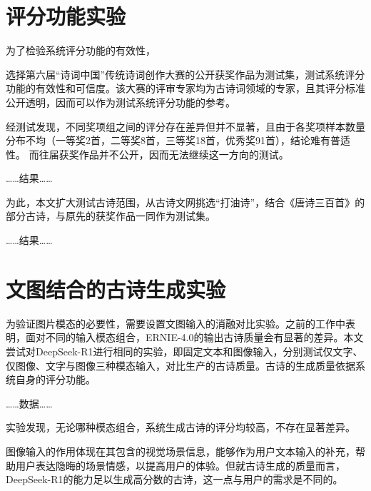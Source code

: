 \section{评分功能实验}

为了检验系统评分功能的有效性，

选择第六届“诗词中国”传统诗词创作大赛的公开获奖作品为测试集，测试系统评分功能的有效性和可信度。该大赛的评审专家均为古诗词领域的专家，且其评分标准公开透明，因而可以作为测试系统评分功能的参考。

经测试发现，不同奖项组之间的评分存在差异但并不显著，且由于各奖项样本数量分布不均（一等奖2首，二等奖8首，三等奖18首，优秀奖91首），结论难有普适性。 而往届获奖作品并不公开，因而无法继续这一方向的测试。

……结果……


为此，本文扩大测试古诗范围，从古诗文网挑选“打油诗”，结合《唐诗三百首》的部分古诗，与原先的获奖作品一同作为测试集。

……结果……

\section{文图结合的古诗生成实验}

为验证图片模态的必要性，需要设置文图输入的消融对比实验。之前的工作中表明，面对不同的输入模态组合，ERNIE-4.0的输出古诗质量会有显著的差异。本文尝试对DeepSeek-R1进行相同的实验，即固定文本和图像输入，分别测试仅文字、仅图像、文字与图像三种模态输入，对比生产的古诗质量。古诗的生成质量依据系统自身的评分功能。

……数据……

实验发现，无论哪种模态组合，系统生成古诗的评分均较高，不存在显著差异。

图像输入的作用体现在其包含的视觉场景信息，能够作为用户文本输入的补充，帮助用户表达隐晦的场景情感，以提高用户的体验。但就古诗生成的质量而言，DeepSeek-R1的能力足以生成高分数的古诗，这一点与用户的需求是不同的。